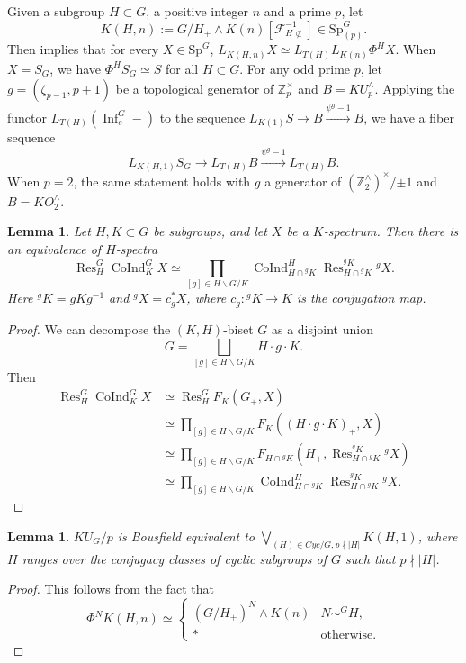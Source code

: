 \documentclass{amsart}
\theoremstyle{plain}
\newtheorem{lemma}[theorem]{Lemma}
\theoremstyle{definition}
\theoremstyle{remark}
\begin{document}
Given a subgroup $H\subset G$, a positive integer $n$ and a prime $p$, let 
    \[
    K(H,n):=G/H_+\wedge K(n) [\mathcal{F}_{H\not\subset}^{-1}]\in \mathrm{Sp}_{(p)}^G.
    \]
Then  implies that for every $X\in \mathrm{Sp}^G$, $L_{K(H,n)} X \simeq L_{T(H)}L_{K(n)}\Phi^HX$. When $X=S_G$, we have $\Phi^H S_G\simeq S$ for all $H\subset G$. For any odd prime $p$, let $g=(\zeta_{p-1},p+1)$ be a topological generator of $\mathbb{Z}_p^{\times}$ and $B=KU_p^\wedge$. Applying the functor $L_{T(H)}(\operatorname{Inf}_e^G-)$ to the sequence $L_{K(1)}S\to B\overset{\psi^g-1}{\longrightarrow} B$, we have a fiber sequence
    \[
    L_{K(H,1)}S_G\rightarrow L_{T(H)}B\overset{\psi^g-1}{\longrightarrow}L_{T(H)}B.
    \]
When $p=2$, the same statement holds with $g$ a generator of $(\mathbb{Z}_2^\wedge)^{\times}/{\pm 1}$ and $B=KO_2^\wedge$.

\begin{lemma}\label{lem: double coset formula}
    Let $H,K\subset G$ be subgroups, and let $X$ be a $K$-spectrum. Then there is an equivalence of $H$-spectra
    \[
    \operatorname{Res}_H^G \operatorname{CoInd}_K^G X \simeq \prod_{[g]\in H\backslash G/K} \operatorname{CoInd}_{H\cap {}^g K}^H \operatorname{Res}_{H\cap {}^g K}^{{}^g K} {}^g X.
    \]
    Here ${}^g K=gKg^{-1}$ and ${}^g X=c_g^* X$, where $c_g: {}^g K\to K$ is the conjugation map.
\end{lemma}
\begin{proof}
    We can decompose the $(K,H)$-biset $G$ as a disjoint union 
    \[
    G= \bigsqcup_{[g]\in H\backslash G/K} H\cdot g \cdot K.
    \]
    Then 
    \[
    \begin{aligned}
        \operatorname{Res}_H^G \operatorname{CoInd}_K^G X &\simeq \operatorname{Res}_H^G F_K(G_+,X)\\
        &\simeq \prod_{[g]\in H\backslash G/K} F_K((H\cdot g \cdot K)_+,X)\\
        &\simeq \prod_{[g]\in H\backslash G/K} F_{H\cap {}^g K}(H_+, \operatorname{Res}_{H\cap {}^g K}^{{}^g K} {}^g X)\\
        &\simeq \prod_{[g]\in H\backslash G/K} \operatorname{CoInd}_{H\cap {}^g K}^H \operatorname{Res}_{H\cap {}^g K}^{{}^g K} {}^g X.
    \end{aligned}
    \]  
\end{proof}

\begin{lemma}\label{lem:bousfield class via morava k}
    $KU_G/p$ is Bousfield equivalent to $\bigvee_{(H) \in Cyc/G, p\nmid |H|} K(H,1)$, where $H$ ranges over the conjugacy classes of cyclic subgroups of $G$ such that $p\nmid |H|$.
\end{lemma}
\begin{proof}
    This follows from the fact that 
    \[ 
    \Phi^N K(H,n)\simeq\begin{cases}
        (G/H_+)^N\wedge K(n) & N\sim^G H,\\
        \ast & \text{otherwise.}
    \end{cases}
    \]
\end{proof}
\end{document}
